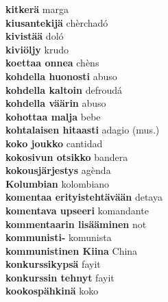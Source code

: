 \textbf{ kitkerä  } marga \\
\textbf{ kiusantekijä  } chèrchadó \\
\textbf{ kivistää  } doló \\
\textbf{ kiviöljy  } krudo \\
\textbf{ koettaa onnea  } chèns \\
\textbf{ kohdella huonosti  } abuso \\
\textbf{ kohdella kaltoin  } defroudá \\
\textbf{ kohdella väärin  } abuso \\
\textbf{ kohottaa malja  } bebe \\
\textbf{ kohtalaisen hitaasti  } adagio (mus.) \\
\textbf{ koko joukko  } cantidad \\
\textbf{ kokosivun otsikko  } bandera \\
\textbf{ kokousjärjestys  } agènda \\
\textbf{ Kolumbian  } kolombiano \\
\textbf{ komentaa erityistehtävään  } detaya \\
\textbf{ komentava upseeri  } komandante \\
\textbf{ kommentaarin lisääminen  } not \\
\textbf{ kommunisti-  } komunista \\
\textbf{ kommunistinen Kiina  } China \\
\textbf{ konkurssikypsä  } fayit \\
\textbf{ konkurssin tehnyt  } fayit \\
\textbf{ kookospähkinä  } koko \\
